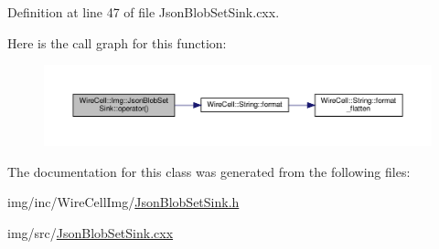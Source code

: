 Definition at line 47 of file Json\+Blob\+Set\+Sink.\+cxx.

Here is the call graph for this function\+:
\nopagebreak
\begin{figure}[H]
\begin{center}
\leavevmode
\includegraphics[width=350pt]{class_wire_cell_1_1_img_1_1_json_blob_set_sink_ac7d31369d8d48559e66d5fe582a88271_cgraph}
\end{center}
\end{figure}


The documentation for this class was generated from the following files\+:\begin{DoxyCompactItemize}
\item 
img/inc/\+Wire\+Cell\+Img/\hyperlink{_json_blob_set_sink_8h}{Json\+Blob\+Set\+Sink.\+h}\item 
img/src/\hyperlink{_json_blob_set_sink_8cxx}{Json\+Blob\+Set\+Sink.\+cxx}\end{DoxyCompactItemize}
